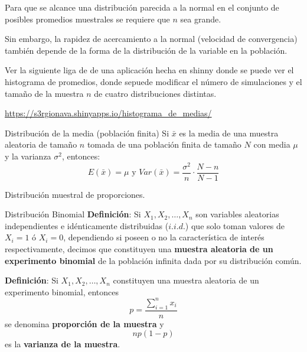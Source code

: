 \documentclass[
  10pt,
  ignorenonframetext,
]{beamer}
\begin{document}
\begin{frame}{}
\protect\hypertarget{section-22}{}
Para que se alcance una distribución parecida a la normal en el conjunto
de posibles promedios muestrales se requiere que \(n\) sea grande.

Sin embargo, la rapidez de acercamiento a la normal (velocidad de
convergencia) también depende de la forma de la distribución de la
variable en la población.

Ver la siguiente liga de de una aplicación hecha en shinny donde se
puede ver el histograma de promedios, donde sepuede modificar el número
de simulaciones y el tamaño de la muestra \(n\) de cuatro distribuciones
distintas.

\url{https://s3rgionava.shinyapps.io/histograma_de_medias/}
\end{frame}

\begin{frame}{Distribución de la media (población finita)}
\protect\hypertarget{distribuciuxf3n-de-la-media-poblaciuxf3n-finita}{}
Si \(\bar{x}\) es la media de una muestra aleatoria de tamaño \(n\)
tomada de una población finita de tamaño \(N\) con media \(\mu\) y la
varianza \(\sigma^2\), entonces:
\[E(\bar{x})=\mu \mbox{ y } Var(\bar{x})=\frac{\sigma^2}{n}\cdot\frac{N-n}{N-1}\]
\end{frame}

\begin{frame}{Distribución muestral de proporciones.}
\protect\hypertarget{distribuciuxf3n-muestral-de-proporciones.}{}
\begin{block}{Distribución Binomial}
\protect\hypertarget{distribuciuxf3n-binomial}{}
\textbf{Definición}: Si \(X_1, X_2, \ldots, X_n\) son variables
aleatorias independientes e idénticamente distribuidas (\(i.i.d.\)) que
solo toman valores de \(X_i = 1\) ó \(X_i = 0\), dependiendo si poseen o
no la característica de interés respectivamente, decimos que constituyen
una \textbf{muestra aleatoria de un experimento binomial} de la
población infinita dada por su distribución común.

\textbf{Definición}: Si \(X_1, X_2, \ldots, X_n\) constituyen una
muestra aleatoria de un experimento binomial, entonces
\[p=\frac{\sum_{i=1}^{n}x_i}{n}\] se denomina \textbf{proporción de la
muestra} y \[np(1-p)\] es la \textbf{varianza de la muestra}.
\end{block}
\end{frame}
\end{document}
